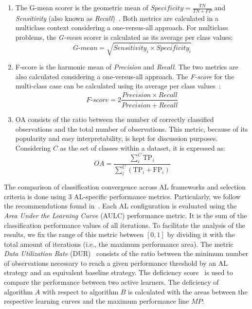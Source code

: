 \documentclass[parskip=full]{scrartcl}
\begin{document}
\begin{enumerate}
    \item The G-mean scorer is the geometric mean of $Specificity =
        \frac{TN}{TN + FP}$ and \textit{Sensitivity} (also known as
        \textit{Recall})~\cite{Kubat1997}. Both metrics are calculated in a
        multiclass context considering a one-versus-all approach. For
        multiclass problems, the \textit{G-mean} scorer is calculated as its
        average per class values: 
        \begin{equation}\label{eq:gmean}
            \textit{G-mean} = \sqrt{\overline{Sensitivity}_i \times
            \overline{Specificity}_i}
        \end{equation}
    
    \item F-score is the harmonic mean of \textit{Precision} and
        \textit{Recall}. The two metrics are also calculated considering a
        one-versus-all approach. The \textit{F-score} for the multi-class case
        can be calculated using its average per class values~\cite{He2009}:
        \begin{equation}\label{eq:fscore}
            \textit{F-score}=2\frac{\overline{Precision} \times
            \overline{Recall}}{\overline{Precision} + \overline{Recall}}
        \end{equation}

    \item OA consists of the ratio between the number of correctly classified
        observations and the total number of observations. This metric, because
        of its popularity and easy interpretability, is kept for discussion
        purposes.  Considering $C$ as the set of classes within a dataset, it
        is expressed as: \begin{equation}\label{eq:oa} \textit{OA} =
        \frac{\sum_{i}^{C}{\text{TP}_{i}}}{\sum_{i}^{C}{(\text{TP}_{i} +
    \text{FP}_{i})}} \end{equation}

\end{enumerate}

The comparison of classification convergence across AL frameworks and selection
criteria is done using 3 AL-specific performance metrics. Particularly, we
follow the recommendations found in~\cite{Kottke2017}. Each AL configuration is
evaluated using the \textit{Area Under the Learning Curve} (AULC) performance
metric. It is the sum of the classification performance values of all
iterations. To facilitate the analysis of the results, we fix the range of this
metric between $[0,1]$ by dividing it with the total amount of iterations
(i.e., the maximum performance area). The metric \textit{Data Utilization Rate}
(DUR)~\cite{Reitmaier2013} consists of the ratio between the minimum number of
observations necessary to reach a given performance threshold by an AL strategy
and an equivalent baseline strategy. The deficiency score~\cite{Yanik2015} is
used to compare the performance between two active learners. The deficiency of
algorithm $A$ with respect to algorithm $B$ is calculated with the areas
between the respective learning curves and the maximum performance line $MP$:
\end{document}
